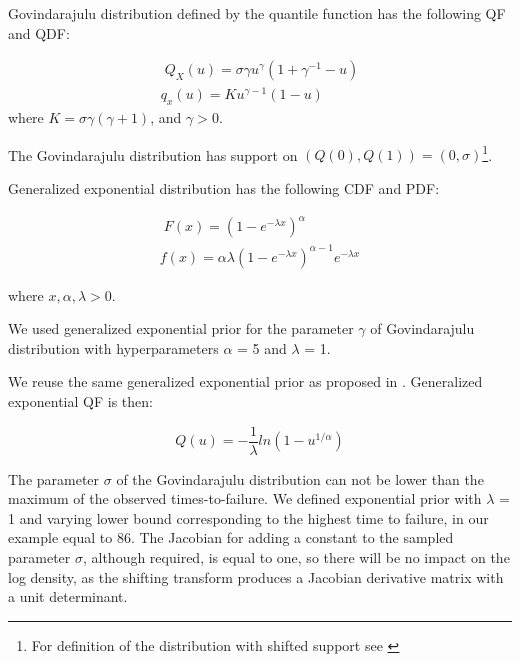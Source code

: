 \documentclass[
  12pt,
]{article}
\begin{document}
Govindarajulu distribution defined by the quantile function has the following QF and QDF:

\[
\begin{gathered}\;
Q_X(u)=\sigma\gamma u^\gamma(1+\gamma^{-1}-u)\\
q_x(u)=Ku^{\gamma-1}(1-u)
\end{gathered}
\]
where \(K=\sigma\gamma(\gamma+1)\), and \(\gamma>0\).

The Govindarajulu distribution has support on \((Q(0), Q(1))=(0, \sigma)\)\footnote{For definition of the distribution with shifted support see \citet{nair2012GovindarajuluDistributionProperties}}.

Generalized exponential distribution has the following CDF and PDF:

\[
\begin{gathered}\;
F(x)=(1-e^{-\lambda x})^\alpha \\
f(x)=\alpha\lambda(1-e^{-\lambda x})^{\alpha-1}e^{-\lambda x}
\end{gathered}
\]

where \(x, \alpha, \lambda>0\).

We used generalized exponential prior for the parameter \(\gamma\) of Govindarajulu distribution with hyperparameters \(\alpha\) = 5 and \(\lambda\) = 1.

We reuse the same generalized exponential prior as proposed in \citep{nair2020BayesianInferenceQuantile}. Generalized exponential QF is then:

\[
Q(u)=-\frac{1}{\lambda}ln(1-u^{1/\alpha})
\]

The parameter \(\sigma\) of the Govindarajulu distribution can not be lower than the maximum of the observed times-to-failure. We defined exponential prior with \(\lambda\) = 1 and varying lower bound corresponding to the highest time to failure, in our example equal to 86. The Jacobian for adding a constant to the sampled parameter \(\sigma\), although required, is equal to one, so there will be no impact on the log density, as the shifting transform produces a Jacobian derivative matrix with a unit determinant.
\end{document}
